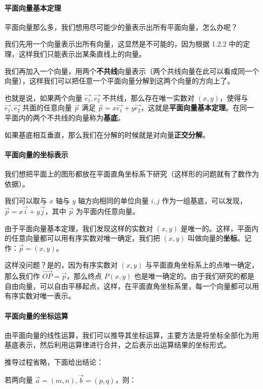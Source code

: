 \paragraph{平面向量基本定理}

平面向量那么多，我们想用尽可能少的量表示出所有平面向量，怎么办呢？

我们先用一个向量表示出所有向量，这显然是不可能的，因为根据 1.2.2 中的定理，这样我们只能表示出某条直线上的向量。

我们再加入一个向量，用两个\textbf{不共线}向量表示（两个共线向量在此可以看成同一个向量），这样我们可以把任意一个平面向量分解到这两个向量的方向上了。

也就是说，如果两个向量 $\vec{e_1},\vec{e_2}$ 不共线，那么存在唯一实数对 $(x,y)$，使得与 $\vec{e_1},\vec{e_2}$ 共面的任意向量 $\vec p$ 满足 $\vec p=x\vec{e_1}+y\vec{e_2}$，这就是\textbf{平面向量基本定理}。在同一平面内的两个不共线的向量称为\textbf{基底}。

如果基底相互垂直，那么我们在分解的时候就是对向量\textbf{正交分解}。

\paragraph{平面向量的坐标表示}

我们想把平面上的图形都放在平面直角坐标系下研究（这样形的问题就有了数作为依据）。

我们可以取与 $x$ 轴与 $y$ 轴方向相同的单位向量 $i,j$ 作为一组基底，可以发现，$\vec p=x\vec i+y\vec j$，其中 $\vec p$ 为平面内任意向量。

由于平面向量基本定理，我们发现这样的实数对 $(x,y)$ 是唯一的。这样，平面内的任意向量都可以用有序实数对唯一确定，我们把 $(x,y)$ 叫做向量的\textbf{坐标}。记作：$\vec p=(x,y)$。

这样没问题？是的，因为有序实数对 $(x,y)$ 与平面直角坐标系上的点唯一确定，那么我们作 $\vec{OP}=\vec p$，那么终点 $P(x,y)$ 也是唯一确定的。由于我们研究的都是自由向量，可以自由平移起点，这样，在平面直角坐标系里，每一个向量都可以用有序实数对唯一表示。

\paragraph{平面向量的坐标运算}

由平面向量的线性运算，我们可以推导其坐标运算，主要方法是将坐标全部化为用基底表示，然后利用运算律进行合并，之后表示出运算结果的坐标形式。

推导过程省略，下面给出结论：

若两向量 $\vec a=(m,n),\vec b=(p,q)$，则：

